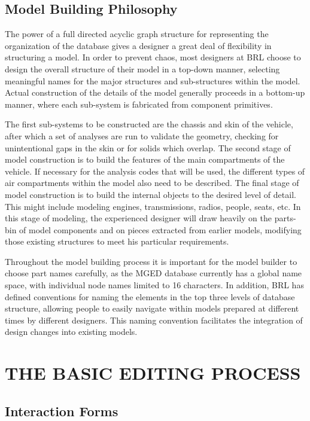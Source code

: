 \section{Model Building Philosophy}

The power of a full directed acyclic graph structure for representing
the organization of the database gives a designer a great deal of
flexibility in structuring a model.
In order to prevent chaos, most designers at BRL choose to
design the overall structure of their model in a top-down manner,
selecting meaningful names for the major structures and sub-structures
within the model.
Actual construction of the details of the
model generally proceeds in a bottom-up
manner, where each sub-system is fabricated from component primitives.

The first sub-systems to be constructed are the chassis and skin of the
vehicle, after which a set of analyses are run to validate the geometry,
checking for unintentional gaps in the skin or for solids which overlap.
The second stage of model construction is to build the features of the
main compartments of the vehicle.  If necessary for the analysis
codes that will be used, the different types of air compartments within
the model also need to be described.
The final stage of model construction is to build the internal
objects to the desired level of detail.
This might include modeling engines, transmissions, radios,
people, seats, etc.
In this stage of modeling, the experienced designer will draw heavily on the
parts-bin of model components and on pieces extracted from earlier
models, modifying those existing structures to meet his particular
requirements.

Throughout the model building process it is important for the model builder
to choose part names carefully, as the MGED database currently has a
global name space, with individual node names limited to 16 characters.
In addition, BRL has defined conventions for naming the elements in the
top three levels of database structure,
allowing people to
easily navigate within models prepared at
different times by different designers.
This naming convention
facilitates the integration of design changes into existing models.

\chapter{THE BASIC EDITING PROCESS}

\section{Interaction Forms}

